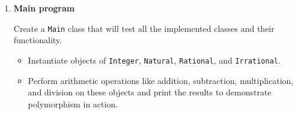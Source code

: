 \begin{enumerate}
\begin{itemize}
\begin{itemize}
                        \begin{itemize}

                            \item \texttt{Irrational(double value)}: Initializes the \texttt{value} attribute by passing it to the parent class constructor.

                        \end{itemize}

                    \item \textbf{Methods:} The mathematical operation methods will work as expected using the inherited floating-point arithmetic, returning approximations since irrational numbers cannot be perfectly represented in a finite decimal form.

                \end{itemize}

        \end{itemize}

    \item \textbf{Main program}

    Create a \texttt{Main} class that will test all the implemented classes and their functionality.

        \begin{itemize}

            \item Instantiate objects of \texttt{Integer}, \texttt{Natural}, \texttt{Rational}, and \texttt{Irrational}.

            \item Perform arithmetic operations like addition, subtraction, multiplication, and division on these objects and print the results to demonstrate polymorphism in action.

        \end{itemize}

\end{enumerate}
